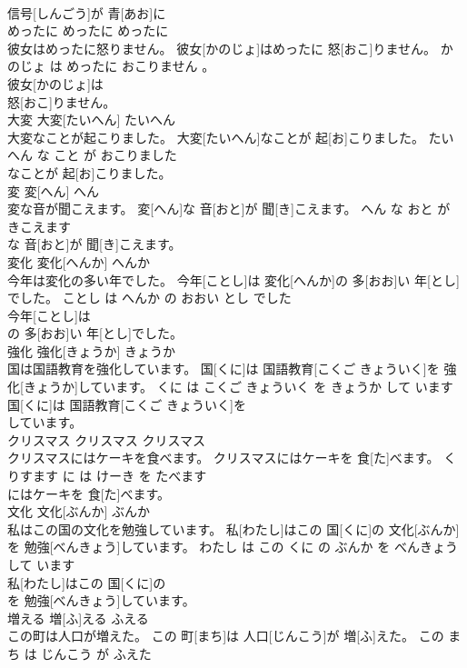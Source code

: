 \documentclass[8pt]{extreport}
\begin{document}
\begin{CJK}{UTF8}{min}
\\	信号[しんごう]が 青[あお]に
\\	めったに	めったに	めったに	
\\	彼女はめったに怒りません。	彼女[かのじょ]はめったに 怒[おこ]りません。	かのじょ は めったに おこりません 。	
\\	彼女[かのじょ]は
\\	怒[おこ]りません。			
\\	大変	大変[たいへん]	たいへん	
\\	大変なことが起こりました。	大変[たいへん]なことが 起[お]こりました。	たいへん な こと が おこりました	
\\	なことが 起[お]こりました。			
\\	変	変[へん]	へん	
\\	変な音が聞こえます。	変[へん]な 音[おと]が 聞[き]こえます。	へん な おと が きこえます	
\\	な 音[おと]が 聞[き]こえます。			
\\	変化	変化[へんか]	へんか	
\\	今年は変化の多い年でした。	今年[ことし]は 変化[へんか]の 多[おお]い 年[とし]でした。	ことし は へんか の おおい とし でした	
\\	今年[ことし]は
\\	の 多[おお]い 年[とし]でした。			
\\	強化	強化[きょうか]	きょうか	
\\	国は国語教育を強化しています。	国[くに]は 国語教育[こくご きょういく]を 強化[きょうか]しています。	くに は こくご きょういく を きょうか して います	
\\	国[くに]は 国語教育[こくご きょういく]を
\\	しています。			
\\	クリスマス	クリスマス	クリスマス	
\\	クリスマスにはケーキを食べます。	クリスマスにはケーキを 食[た]べます。	くりすます に は けーき を たべます	
\\	にはケーキを 食[た]べます。			
\\	文化	文化[ぶんか]	ぶんか	
\\	私はこの国の文化を勉強しています。	私[わたし]はこの 国[くに]の 文化[ぶんか]を 勉強[べんきょう]しています。	わたし は この くに の ぶんか を べんきょう して います	
\\	私[わたし]はこの 国[くに]の
\\	を 勉強[べんきょう]しています。			
\\	増える	増[ふ]える	ふえる	
\\	この町は人口が増えた。	この 町[まち]は 人口[じんこう]が 増[ふ]えた。	この まち は じんこう が ふえた	

\end{CJK}
\end{document}
